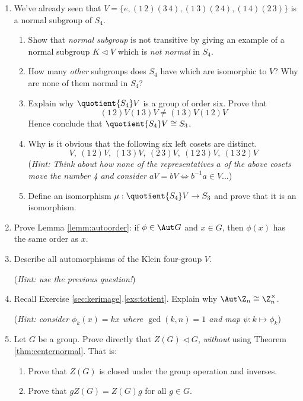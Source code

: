 \begin{exercises}{}{}
\begin{enumerate}
	  
		\item We've already seen that $V=\{e,(1\,2)(3\,4),(1\,3)(2\,4),(1\,4)(2\,3)\}$ is a normal subgroup of $S_4$.
		\begin{enumerate}
	  	\item Show that \emph{normal subgroup} is not transitive by giving an example of a normal subgroup $K\triangleleft V$ which is \emph{not normal} in $S_4$.
	  	
	  	\item How many \emph{other} subgroups does $S_4$ have which are isomorphic to $V$? Why are none of them normal in $S_4$?
	  	
			\item Explain why $\quotient{S_4}V$ is a group of order six. Prove that
			\[
				(1\,2)V(1\,3)V\neq (1\,3)V(1\,2)V
			\]
			Hence conclude that $\quotient{S_4}V\cong S_3$.
			
			\item Why is it obvious that the following six left cosets are distinct.
			\[
				V,\ (1\,2)V,\ (1\,3)V,\ (2\,3)V,\ (1\,2\,3)V,\ (1\,3\,2)V
			\]
			(\emph{Hint: Think about how none of the representatives $a$ of the above cosets move the number 4 and consider $aV=bV\iff b^{-1}a\in V\ldots$})
			
			\item Define an isomorphism $\mu:\quotient{S_4}V\to S_3$ and prove that it is an isomorphism.
	\end{enumerate}
	
	
		\item Prove Lemma \ref{lemm:autoorder}: if $\phi\in\Aut G$ and $x\in G$, then $\phi(x)$ has the same order as $x$.
	  
	  
	  \item Describe all automorphisms of the Klein four-group $V$.\par
	  (\emph{Hint: use the previous question!})
	  
	  
	  \item Recall Exercise \ref*{sec:kerimage}.\ref{exs:totient}. Explain why $\Aut\Z_n\cong\Z_n^\times$.\par
	  (\emph{Hint: consider $\phi_k(x)=kx$ where $\gcd(k,n)=1$ and map $\psi:k\mapsto\phi_k$})
	  
	  
	  \item Let $G$ be a group. Prove directly that $Z(G)\triangleleft G$, \emph{without} using Theorem \ref{thm:centernormal}. That is:
		\begin{enumerate}
	  	\item Prove that $Z(G)$ is closed under the group operation and inverses.
	  	\item Prove that $gZ(G)=Z(G)g$ for all $g\in G$.
		\end{enumerate}
		

\end{enumerate}
\end{exercises}
